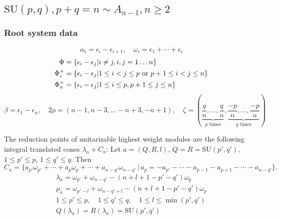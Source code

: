 \subsection[SU(p,q)]{$\mathrm{SU}(p,q), p+q=n \sim A_{n-1}, n \geq 2$}\label{sec:su}

\subsubsection{Root system data}

\[\alpha_i = \epsilon_i - \epsilon_{i+1}, \quad \omega_i = \epsilon_1 + \cdots + \epsilon_i \]
\begin{align*}
 \Phi & = \{ \epsilon_i - \epsilon_j | i\neq j, i,j=1\ldots n\}\\
 \Phi_c^+ & = \{ \epsilon_i-\epsilon_j | 1\leq i < j \leq p \text{ or } p+1 \leq i < j \leq n\}\\
 \Phi_n^+ & = \{ \epsilon_i - \epsilon_j | 1 \leq i \leq p, p+1 \leq j \leq n \}
\end{align*}
\[\beta = \epsilon_1 - \epsilon_n,\quad 2\rho = (n-1,n-3,\ldots -n+3,-n+1),\quad \zeta = (\underbrace{\frac{q}{n},\ldots,\frac{q}{n}}_{p\text{ times}},\underbrace{\frac{-p}{n},\ldots,\frac{-p}{n}}_{q\text{ times}})\]

The reduction points of unitarizable highest weight modules are the following integral translated cones $\lambda_a + C_a$:
Let $a=(Q,R,l)$, $Q=R=\mathrm{SU}(p',q')$, $1\leq p' \leq p$, $1\leq q'\leq q$. Then
\[
 C_a = \{a_{p'}\omega_{p'} + \cdots + a_p\omega_p + \cdots + a_{n-q'}\omega_{n-q'} \,|\, a_p=-a_{p'}-\cdots -a_{p-1}-a_{p+1} - \cdots - a_{n-q'} \}.
\]
\begin{gather*}
  \lambda_a=\omega_{p'} + \omega_{n-q'} - (n+l+1-p'-q')\omega_p   \\
  \mu_a = \omega_{p'-l}+\omega_{n-q'+l}-(n+l+1-p'-q')\omega_p\\
  1\leq p' \leq p,\quad 1\leq q' \leq q,\quad 1\leq l \leq \min(p',q')\\
  Q(\lambda_a)=R(\lambda_a)=\mathrm{SU}(p',q')
\end{gather*}

